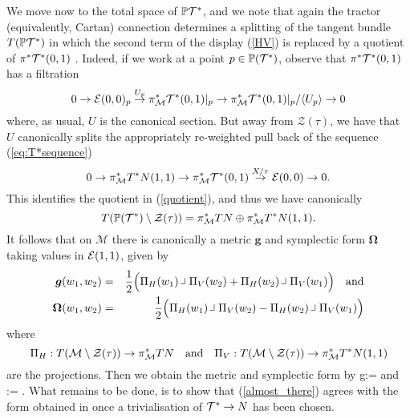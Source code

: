 We move now to the total space of $\mathbb{P} {\mathcal{T}^*}$, and we note that again the tractor (equivalently, Cartan) connection determines a splitting of the tangent bundle $T(\mathbb{P} {\mathcal{T}^*})$ in which the second term of the display (\ref{HV}) is replaced by a quotient of $\pi^* \mathcal{T}^*(0,1)$ \cite{CGH-duke}. Indeed, if we work at a point $p\in \mathbb{P}(\mathcal{T}^*)$, observe that $\pi^*\mathcal{T}^*(0,1)$ has a filtration
\begin{equation}\label{quotient}
0\to \mathcal{E} (0,0)_p\stackrel{U_p}{\to}  \pi_{\mathcal{M}}^* \mathcal{T}^*(0,1)|_p \to  \pi_{\mathcal{M}}^* \mathcal{T}^*(0,1)|_p/\langle U_p \rangle \to 0
\end{equation}
where, as usual, $U$ is the canonical section. 
But away from $\mathcal{Z}(\tau )$, we have that  $U$ canonically splits 
the appropriately re-weighted pull back of  the sequence (\ref{eq:T*sequence})
$$
0\to \pi_{\mathcal{M}}^* T^*N(1,1)   \to \pi_{\mathcal{M}}^* \mathcal{T}^*(0,1) \stackrel{X/\tau}{\to} \mathcal{E}(0,0) \to 0 .
$$
This identifies the quotient in (\ref{quotient}), and thus we have canonically
$$
T(\mathbb{P}(\mathcal{T}^*)\setminus \mathcal{Z}(\tau))=  \pi_{\mathcal{M}}^*TN\oplus \pi_{\mathcal{M}}^*T^*N(1,1).
$$
It follows that on  $\mathcal{M}$
there is canonically a metric $\boldsymbol{g}$ and symplectic form $\boldsymbol{\Omega}$ taking values in $\mathcal{E}(1,1)$, given by
\begin{eqnarray*}
\boldsymbol{g}(w_1,w_2)&=& \frac{1}{2}\Big(
\pp_H(w_1)\hook \pp_V(w_2)+\pp_H(w_2)\hook\pp_V(w_1)\Big) \quad \mbox{and} \\
\boldsymbol{\Omega}(w_1,w_2)&=& \frac{1}{2}\Big(\pp_H(w_1)\hook \pp_V(w_2)-\pp_H(w_2)\hook\pp_V(w_1)\Big)
\end{eqnarray*}
where
$$
\mbox{$\scriptsize{\Pi}$}_H: T(\mathcal{M}\setminus \mathcal{Z}(\tau))\to \pi_{\mathcal{M}}^*TN \quad \mbox{and} \quad \mbox{$\scriptsize{\Pi}$}_V: T(\mathcal{M}\setminus \mathcal{Z}(\tau))\to \pi_{\mathcal{M}}^* T^*N(1,1)
$$
are the projections.
Then we obtain the metric and symplectic form by
\be
\label{almost_there}
g:= \qquad \mbox{and} \qquad \Omega:=\boldsymbol{\Omega} .
\ee
What remains to be done, is to show that (\ref{almost_there}) agrees
with the form obtained in \cite{DM} once a trivialisation of
$\mathcal{T}^*\rightarrow N$ has been chosen.

